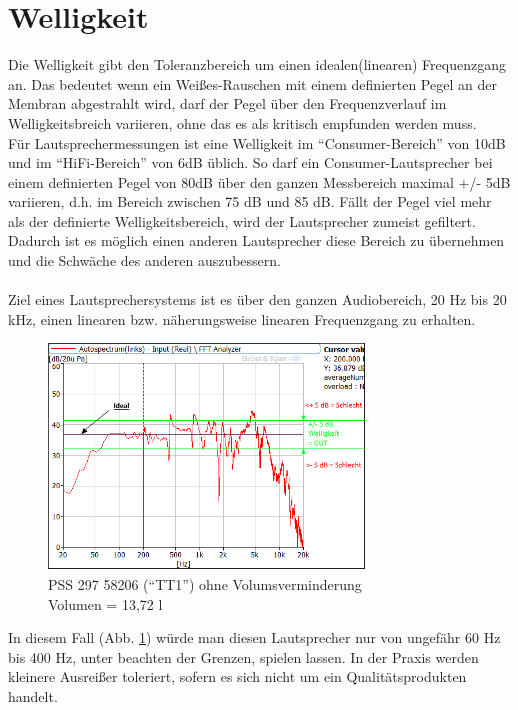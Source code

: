 \section{Welligkeit} \label{sec:8.6}
Die Welligkeit gibt den Toleranzbereich um einen idealen(linearen) Frequenzgang an.
Das bedeutet wenn ein Weißes-Rauschen mit einem definierten Pegel an der Membran abgestrahlt wird, darf der Pegel über den Frequenzverlauf im Welligkeitsbreich variieren, ohne das es als kritisch empfunden werden muss. \\
Für Lautsprechermessungen ist eine Welligkeit im \enquote{Consumer-Bereich} von 10dB und im \enquote{HiFi-Bereich} von 6dB üblich.
So darf ein Consumer-Lautsprecher bei einem definierten Pegel von 80dB über den ganzen Messbereich maximal +/- 5dB variieren, d.h. im Bereich zwischen 75 dB und 85 dB.
Fällt der Pegel viel mehr als der definierte Welligkeitsbereich, wird der Lautsprecher zumeist gefiltert.
Dadurch ist es möglich einen anderen Lautsprecher diese Bereich zu übernehmen und die Schwäche des anderen auszubessern.\\ \\
Ziel eines Lautsprechersystems ist es über den ganzen Audiobereich, 20 Hz bis 20 kHz, einen linearen bzw. näherungsweise linearen Frequenzgang zu erhalten.

\begin{figure} [H]
	\centering
	\includegraphics[width=0.75\textwidth]{img/Optimierung/TT/TT1_ohneAllem_welligkeit.png}
	\caption{PSS 297 58206 (\enquote{TT1}) ohne Volumsverminderung \\Volumen = 13,72 l}
	\label{fig:8.6.1}
\end{figure}

In diesem Fall (Abb. \ref{fig:8.6.1}) würde man diesen Lautsprecher nur von ungefähr 60 Hz bis 400 Hz, unter beachten der Grenzen, spielen lassen.
In der Praxis werden kleinere Ausreißer toleriert, sofern es sich nicht um ein Qualitätsprodukten handelt.



